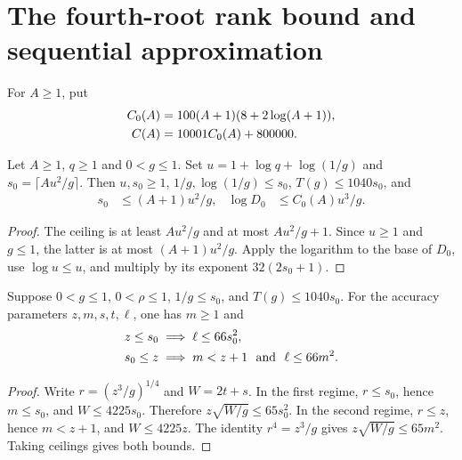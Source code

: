\section{The fourth-root rank bound and sequential approximation}

\begin{definition}
    \label{def:aklv_accuracy_log_coefficients}
    \leanok
    For $A\ge1$, put
    \begin{align*}
        C_0(A) & =100(A+1)(8+2\log(A+1)),\notag \\
        C(A)   & =10001C_0(A)+800000.
    \end{align*}
\end{definition}

\begin{lemma}
    \label{thm:aklv_initial_log_rank_scale}
    \leanok
    Let $A\ge1$, $q\ge1$ and $0<g\le1$. Set
    $u=1+\log q+\log(1/g)$ and $s_0=\lceil Au^2/g\rceil$.
    Then $u,s_0\ge1$, $1/g,\log(1/g)\le s_0$,
    $T(g)\le1040s_0$, and
    \begin{align*}
        s_0      & \le(A+1)u^2/g,   &
        \log D_0 & \le C_0(A)u^3/g.
    \end{align*}
\end{lemma}
\begin{proof}
    \leanok
    The ceiling is at least $Au^2/g$ and at most $Au^2/g+1$.
    Since $u\ge1$ and $g\le1$, the latter is at most $(A+1)u^2/g$.
    Apply the logarithm to the base of $D_0$, use $\log u\le u$,
    and multiply by its exponent $32(2s_0+1)$.
\end{proof}

\begin{lemma}
    \label{thm:aklv_accuracy_two_degree_regimes}
    \leanok
    Suppose $0<g\le1$, $0<\rho\le1$, $1/g\le s_0$, and
    $T(g)\le1040s_0$. For the accuracy parameters $z,m,s,t,\ell$,
    one has $m\ge1$ and
    \begin{align*}
        z\le s_0 & \implies \ell\le66s_0^2,\notag              \\
        s_0\le z & \implies m<z+1\ \text{ and }\ \ell\le66m^2.
    \end{align*}
\end{lemma}
\begin{proof}
    \leanok
    Write $r=(z^3/g)^{1/4}$ and $W=2t+s$. In the first regime,
    $r\le s_0$, hence $m\le s_0$, and $W\le4225s_0$.
    Therefore $z\sqrt{W/g}\le65s_0^2$.
    In the second regime, $r\le z$, hence $m<z+1$, and
    $W\le4225z$. The identity $r^4=z^3/g$ gives
    $z\sqrt{W/g}\le65m^2$. Taking ceilings gives both bounds.
\end{proof}

